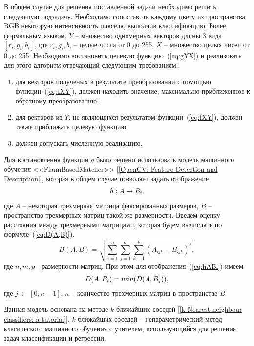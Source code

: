 \documentclass[14pt, a4paper]{extreport}
\begin{document}
	В общем случае для решения поставленной задачи необходимо решить следующую подзадачу. Необходимо сопоставить каждому цвету из пространства RGB некоторую интенсивность пикселя, выполнив классификацию. Более формальным языком, $Y$ -- множество одномерных векторов длины 3 вида $[r_i, g_i, b_i]$, где $r_i, g_i, b_i$ -- целые числа от 0 до 255, $X$ -- множество целых чисел от 0 до 255. Необходимо востановить целевую функцию~(\ref{eq:gYX}) и реализовать для этого алгоритм отвечающий следующим требованиям:
	\begin{enumerate}[label={\arabic*)}]
		\item для векторов полученых в результате преобразовании с помощью функции~(\ref{eq:fXY}), должен находить значение, максимально приближенное к обратному преобразованию;
		\item для векторов из $Y$, не являющихся результатом функции~(\ref{eq:fXY}), должен также приближать целевую функцию;
		\item должен допускать численную реализацию.
	\end{enumerate}
	
	Для востановления функции $g$ было решено использовать модель машинного обучения <<FlannBasedMatcher>> [\ref{OpenCV: Feature Detection and Description}], которая в общем случае позволяет задать отображение
	\vspace*{-0.2cm}
	\begin{equation}
		h: A \rightarrow B_i,
		\label{eq:hABi}
		\vspace*{-0.4cm}
	\end{equation}
	где $A$ -- некоторая трехмерная матрица фиксированных размеров, $B$ -- пространство трехмерных матриц такой же размерности. Введем оценку расстояния между трехмерными матрицами, которая будем вычислять по формуле~(\ref{eq:D(A,B)}).
	\begin{equation}
		D(A, B) = \sqrt{\sum\limits_{i=1}^n \sum\limits_{j=1}^m \sum\limits_{k=1}^p (A_{ijk} - B_{ijk})^2},
		\label{eq:D(A,B)}
	\end{equation}
	где $n, m, p$ - размерности матриц. При этом для отображения~(\ref{eq:hABi}) имеем 
	\vspace*{-0.2cm}
	\begin{equation*}
		D(A, B_i) = min(D(A, B_j)), 
		\label{eq:D(A,B_i)}
		\vspace*{-0.4cm}
	\end{equation*}
	где $j~\in~[0, n-1]$, $n$ -- количество трехмерных матриц в пространстве $B$. 
	
	Данная модель основана на методе $k$ ближайших соседей [\ref{k-Nearest neighbour classifiers: a tutorial}]. $k$ ближайших соседей -- непараметрический метод класического машинного обучения с учителем, использующийся для решения задач классификации и регрессии. 
	
\end{document}
